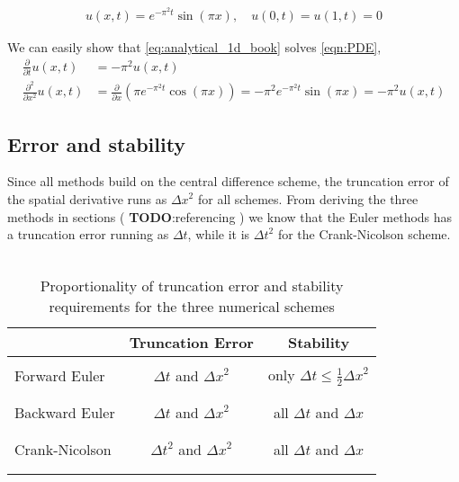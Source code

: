 \documentclass[10pt,a4paper]{article}
\newcommand{\dt}{{\Delta t}}
\newcommand{\dx}{{\Delta x}}
\newcommand{\fracpt}{\frac{\partial}{\partial t}}
\newcommand{\fracpx}{\frac{\partial}{\partial x}}
\newcommand{\fracpxx}{\frac{\partial^2}{\partial x^2}}
\begin{document}
\begin{align}\label{eq:analytical_1d_book}
    u(x, t) = e^{-\pi^2 t} \sin(\pi x) , \quad u(0, t) = u(1, t) = 0
\end{align}

We can easily show that \vref{eq:analytical_1d_book} solves \vref{eqn:PDE},
\begin{align}
\fracpt u(x, t) &= -\pi^2 u(x, t) \\
\fracpxx u(x, t) &= \fracpx \left(\pi e^{-\pi^2 t} \cos(\pi x) \right)
= -\pi^2 e^{-\pi^2 t} \sin(\pi x) = -\pi^2 u(x, t)
\end{align}



\subsection{Error and stability}
Since all methods build on the central difference scheme, the truncation error of the spatial derivative runs as $\dx^2$ for all schemes. From deriving the three methods in sections ( \textbf{TODO}:referencing ) we know that the Euler methods has a truncation error running as $\dt$, while it is $\dt^2$ for the Crank-Nicolson scheme.
\\\\



\begin{table}[htb]
\begin{center}
\begin{tabular}{lcc}
 		& Truncation Error	& Stability
\\ \hline \\
Forward Euler	& $\dt$ and $\dx^2$	& only $\dt \le \frac{1}{2}\dx^2$ \\
\\ \hline \\
Backward Euler	& $\dt$ and $\dx^2$	& all $\dt$ and $\dx$ \\
\\ \hline \\
Crank-Nicolson	& $\dt^2$ and $\dx^2$	& all $\dt$ and $\dx$ \\
\\ \hline \\
\end{tabular}
\end{center}
\caption{Proportionality of truncation error and stability requirements for the three numerical schemes}
\label{table:error}
\end{table}
\end{document}
